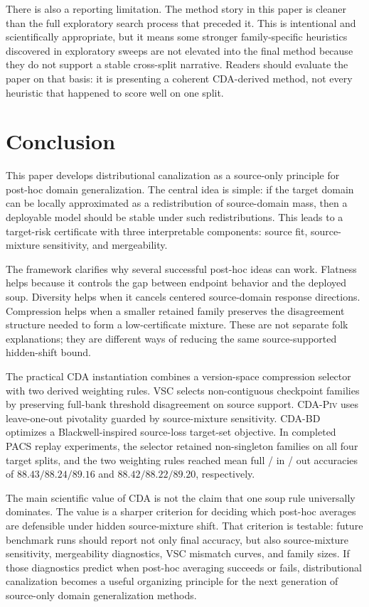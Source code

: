 \documentclass{article}
\theoremstyle{definition}
\newcommand{\piv}{\textup{\textsc{CDA-Piv}}}
\newcommand{\bd}{\textup{\textsc{CDA-BD}}}
\begin{document}
There is also a reporting limitation. The method story in this paper is cleaner than the full exploratory search process that preceded it. This is intentional and scientifically appropriate, but it means some stronger family-specific heuristics discovered in exploratory sweeps are not elevated into the final method because they do not support a stable cross-split narrative. Readers should evaluate the paper on that basis: it is presenting a coherent CDA-derived method, not every heuristic that happened to score well on one split.

\section{Conclusion}

This paper develops distributional canalization as a source-only principle for post-hoc domain generalization. The central idea is simple: if the target domain can be locally approximated as a redistribution of source-domain mass, then a deployable model should be stable under such redistributions. This leads to a target-risk certificate with three interpretable components: source fit, source-mixture sensitivity, and mergeability.

The framework clarifies why several successful post-hoc ideas can work. Flatness helps because it controls the gap between endpoint behavior and the deployed soup. Diversity helps when it cancels centered source-domain response directions. Compression helps when a smaller retained family preserves the disagreement structure needed to form a low-certificate mixture. These are not separate folk explanations; they are different ways of reducing the same source-supported hidden-shift bound.

The practical CDA instantiation combines a version-space compression selector with two derived weighting rules. VSC selects non-contiguous checkpoint families by preserving full-bank threshold disagreement on source support. \piv{} uses leave-one-out pivotality guarded by source-mixture sensitivity. \bd{} optimizes a Blackwell-inspired source-loss target-set objective. In completed PACS replay experiments, the selector retained non-singleton families on all four target splits, and the two weighting rules reached mean full / in / out accuracies of \(88.43/88.24/89.16\) and \(88.42/88.22/89.20\), respectively.

The main scientific value of CDA is not the claim that one soup rule universally dominates. The value is a sharper criterion for deciding which post-hoc averages are defensible under hidden source-mixture shift. That criterion is testable: future benchmark runs should report not only final accuracy, but also source-mixture sensitivity, mergeability diagnostics, VSC mismatch curves, and family sizes. If those diagnostics predict when post-hoc averaging succeeds or fails, distributional canalization becomes a useful organizing principle for the next generation of source-only domain generalization methods.
\end{document}
